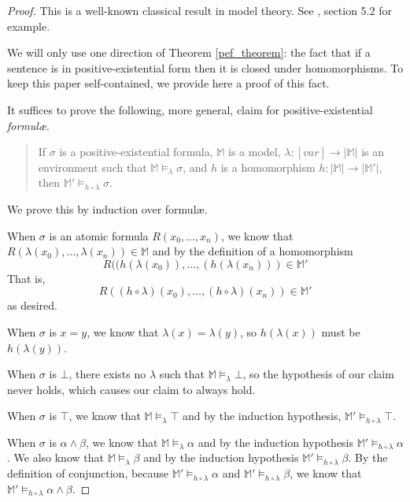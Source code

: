 		\begin{proof}
			This is a well-known classical result in model theory. See
			\cite{ChangKeisler73}, section 5.2 for example.

			We will only use one direction of Theorem \ref{pef_theorem}: the
			fact that if a sentence is in positive-existential form then it is
			closed under homomorphisms. To keep this paper self-contained, we
			provide here a proof of this fact.

			It suffices to prove the following, more general, claim for
			positive-existential \emph{formul{\ae}}.

			\begin{quote}
				If $\sigma$ is a positive-existential formula, $\mathbb{M}$ is
				a model, $\lambda : [var] \to |\mathbb{M}|$ is an environment
				such that $\mathbb{M} \models_\lambda \sigma$, and $h$ is a
				homomorphism $h : |\mathbb{M}| \to |\mathbb{M}'|$, then
				$\mathbb{M}' \models_{h\circ\lambda} \sigma$.
			\end{quote}

			We prove this by induction over formul{\ae}.

			When $\sigma$ is an atomic formula $R(x_0,\ldots,x_n)$, we know
			that $R(\lambda(x_0),\ldots,\lambda(x_n)) \in \mathbb{M}$ and by
			the definition of a homomorphism
				\[
				R((h(\lambda(x_0)),\ldots,(h(\lambda(x_n))) \in \mathbb{M}'
				\]
			That is,
				\[
				R((h\circ\lambda)(x_0),\ldots,(h\circ\lambda)(x_n)) \in \mathbb{M'}
				\]
			as desired.

			When $\sigma$ is $x=y$, we know that $\lambda(x) = \lambda(y)$, so
			$h(\lambda(x))$ must be $h(\lambda(y))$.

			When $\sigma$ is $\bot$, there exists no $\lambda$ such that
			$\mathbb{M} \models_\lambda \bot$, so the hypothesis of our claim
			never holds, which causes our claim to always hold.

			When $\sigma$ is $\top$, we know that $\mathbb{M} \models_\lambda
			\top$ and by the induction hypothesis, $\mathbb{M}'
			\models_{h\circ\lambda} \top$.

			When $\sigma$ is $\alpha \wedge \beta$, we know that $\mathbb{M}
			\models_\lambda \alpha$ and by the induction hypothesis
			$\mathbb{M}' \models_{h\circ\lambda} \alpha$. We also know that
			$\mathbb{M} \models_\lambda \beta$ and by the induction hypothesis
			$\mathbb{M}' \models_{h\circ\lambda} \beta$. By the definition of
			conjunction, because $\mathbb{M}' \models_{h\circ\lambda} \alpha$
			and $\mathbb{M}' \models_{h\circ\lambda} \beta$, we know that
			$\mathbb{M}' \models_{h\circ\lambda} \alpha \wedge \beta$.


\end{proof}

